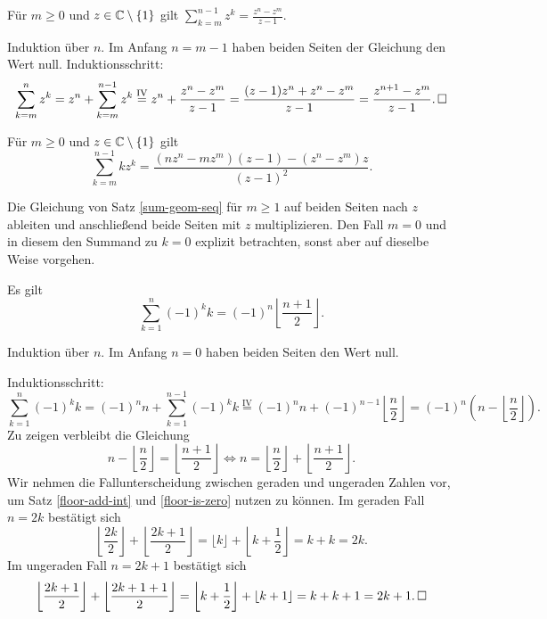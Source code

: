 \begin{Satz}%
\label{sum-geom-seq}\newlinefirst
Für $m\ge 0$ und $z\in\mathbb C\setminus\{1\}$ gilt
$\displaystyle\sum_{k=m}^{n-1} z^k = \frac{z^n-z^m}{z-1}$.
\end{Satz}
\begin{Beweis}
Induktion über $n$. Im Anfang $n=m-1$ haben beiden Seiten der Gleichung
den Wert null. Induktionsschritt:
\[\sum_{k=m}^n z^k = z^n + \sum_{k=m}^{n-1} z^k
\stackrel{\mathrm{IV}}= z^n + \frac{z^n-z^m}{z-1}
= \frac{(z-1)z^n+z^n-z^m}{z-1}
= \frac{z^{n+1}-z^m}{z-1}.\,\square\]
\end{Beweis}

\begin{Satz}
Für $m\ge 0$ und $z\in\mathbb C\setminus\{1\}$ gilt
\[\sum_{k=m}^{n-1} kz^k
= \frac{(nz^n-mz^m)(z-1) - (z^n-z^m)z}{(z-1)^2}.\]
\end{Satz}
\begin{Beweis}
Die Gleichung von Satz \ref{sum-geom-seq} für $m\ge 1$ auf beiden
Seiten nach $z$ ableiten und anschließend beide Seiten mit $z$
multiplizieren. Den Fall $m=0$ und in diesem den Summand zu $k=0$
explizit betrachten, sonst aber auf dieselbe Weise vorgehen.\,\qedsymbol
\end{Beweis}

\newpage
\begin{Satz} Es gilt
\[\sum_{k=1}^n (-1)^k k = (-1)^n\left\lfloor\frac{n+1}{2}\right\rfloor.\]
\end{Satz}
\begin{Beweis}
Induktion über $n$. Im Anfang $n=0$ haben beiden Seiten den Wert null.

Induktionsschritt:
\[\sum_{k=1}^n (-1)^k k = (-1)^n n + \sum_{k=1}^{n-1} (-1)^k k
\stackrel{\mathrm{IV}}= (-1)^n n + (-1)^{n-1}\left\lfloor\frac{n}{2}\right\rfloor
= (-1)^n (n-\left\lfloor\frac{n}{2}\right\rfloor).\]
Zu zeigen verbleibt die Gleichung
\[n-\left\lfloor\frac{n}{2}\right\rfloor = \left\lfloor\frac{n+1}{2}\right\rfloor
\iff n = \left\lfloor\frac{n}{2}\right\rfloor + 
\left\lfloor\frac{n+1}{2}\right\rfloor.\]
Wir nehmen die Fallunterscheidung zwischen geraden und ungeraden
Zahlen vor, um Satz \ref{floor-add-int} und \ref{floor-is-zero}
nutzen zu können. Im geraden Fall $n=2k$ bestätigt sich
\[\left\lfloor\frac{2k}{2}\right\rfloor +  \left\lfloor\frac{2k+1}{2}\right\rfloor
= \lfloor k\rfloor + \left\lfloor k + \frac{1}{2}\right\rfloor = k + k = 2k.\]
Im ungeraden Fall $n=2k+1$ bestätigt sich
\[\left\lfloor\frac{2k+1}{2}\right\rfloor + \left\lfloor\frac{2k+1+1}{2}\right\rfloor
= \left\lfloor k + \frac{1}{2}\right\rfloor + \left\lfloor k+1\right\rfloor
= k + k + 1 = 2k + 1.\,\square\]
\end{Beweis}

